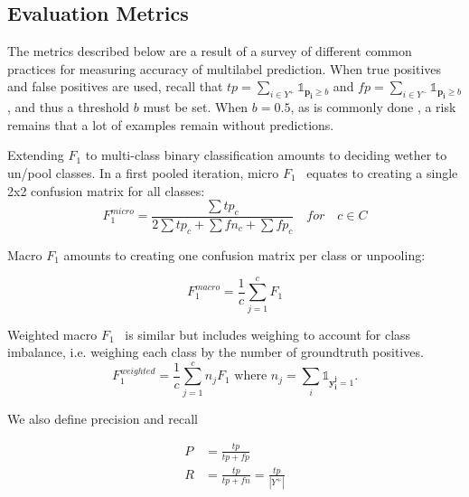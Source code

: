 


\subsection{Evaluation Metrics}
\label{sec:org23c8447}


The metrics described below are a result of a survey of different common practices for measuring accuracy of multilabel prediction. When true positives and false positives are used, recall that \(t p=\sum_{i \in Y^{+}} \mathds{1}_{\mathbf{p_i} \geq b}\) and \(f p=\sum_{i \in Y^{-}} \mathds{1}_{\mathbf{p_i} \geq b}\), and thus a threshold \(b\) must be set. When \(b = 0.5\), as is commonly done , a risk remains that a lot of examples remain without predictions.

Extending \(F_1\) to multi-class binary classification amounts to deciding wether to un/pool classes.
In a first pooled iteration, micro \(F_1\)~\cite{multilabelMetrics} equates to creating a single 2x2 confusion matrix for all classes:
$$F_1^{micro} = \frac{\sum tp_c}{2 \sum tp_c + \sum fn_c + \sum fp_c} \quad for \quad c \in C$$

Macro \(F_1\) \cite{threshForF1, multilabelMetrics} amounts to creating one confusion matrix per class or unpooling:

$$F_1^{macro} = \frac{1}{c} \sum_{j=1}^c F_1$$


Weighted macro \(F_1\)~\cite{weightedMetrics} is similar but includes weighing to account for class imbalance, i.e. weighing each class by the number of groundtruth positives.
\begin{equation}
F_1^{weighted} = \frac{1}{c} \sum_{j=1}^c n_j F_1 \text{ where } n_j = \sum_i \mathds{1}_{\mathbf{y_i^j} = 1}.
\end{equation}


We also define precision and recall

\begin{equation}
\begin{aligned} P &=\frac{t p}{t p+f p} \\ R &=\frac{t p}{t p+f n}=\frac{t p}{\left|Y^{+}\right|} \end{aligned}
\end{equation}

